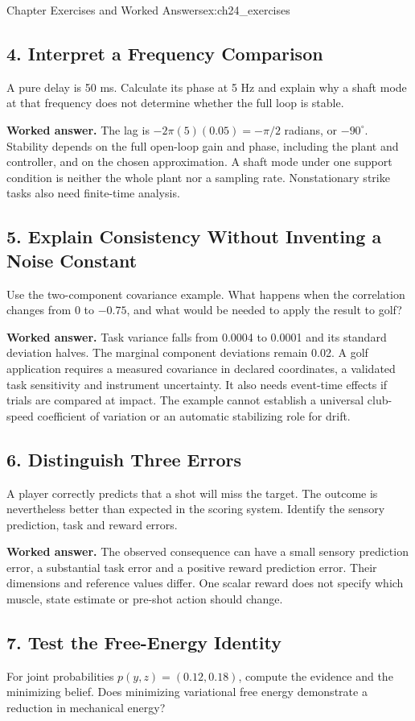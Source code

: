 \begin{exercises}{Chapter Exercises and Worked Answers}{ex:ch24_exercises}
\subsection*{4. Interpret a Frequency Comparison}
A pure delay is 50 ms. Calculate its phase at 5 Hz and explain why a shaft mode at that frequency does not determine whether the full loop is stable.

\textbf{Worked answer.} The lag is $-2\pi(5)(0.05)=-\pi/2$ radians, or $-90^\circ$. Stability depends on the full open-loop gain and phase, including the plant and controller, and on the chosen approximation. A shaft mode under one support condition is neither the whole plant nor a sampling rate. Nonstationary strike tasks also need finite-time analysis.

\subsection*{5. Explain Consistency Without Inventing a Noise Constant}
Use the two-component covariance example. What happens when the correlation changes from 0 to $-0.75$, and what would be needed to apply the result to golf?

\textbf{Worked answer.} Task variance falls from 0.0004 to 0.0001 and its standard deviation halves. The marginal component deviations remain 0.02. A golf application requires a measured covariance in declared coordinates, a validated task sensitivity and instrument uncertainty. It also needs event-time effects if trials are compared at impact. The example cannot establish a universal club-speed coefficient of variation or an automatic stabilizing role for drift.

\subsection*{6. Distinguish Three Errors}
A player correctly predicts that a shot will miss the target. The outcome is nevertheless better than expected in the scoring system. Identify the sensory prediction, task and reward errors.

\textbf{Worked answer.} The observed consequence can have a small sensory prediction error, a substantial task error and a positive reward prediction error. Their dimensions and reference values differ. One scalar reward does not specify which muscle, state estimate or pre-shot action should change.

\subsection*{7. Test the Free-Energy Identity}
For joint probabilities $p(y,z)=(0.12,0.18)$, compute the evidence and the minimizing belief. Does minimizing variational free energy demonstrate a reduction in mechanical energy?


\end{exercises}
